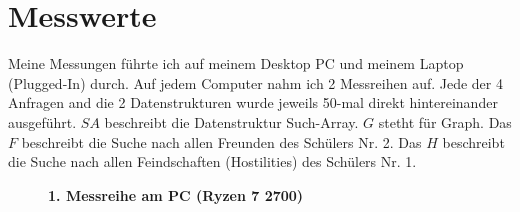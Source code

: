 \documentclass[11pt,a4paper]{article}
\begin{document}
\section{Messwerte}

Meine Messungen führte ich auf meinem Desktop PC und meinem Laptop (Plugged-In) durch.
Auf jedem Computer nahm ich 2 Messreihen auf.
Jede der 4 Anfragen and die 2 Datenstrukturen wurde jeweils 50-mal direkt hintereinander
ausgeführt.
$SA$ beschreibt die Datenstruktur Such-Array. $G$ stetht für Graph.
Das $F$ beschreibt die Suche nach allen Freunden des Schülers Nr. 2.
Das $H$ beschreibt die Suche nach allen Feindschaften (Hostilities) des Schülers Nr. 1.

\clearpage

\begin{figure}[H]
    \centering
    \vspace*{-0.8cm}
    \caption{\textbf{1. Messreihe am PC (Ryzen 7 2700)}}
\end{figure}
\end{document}
